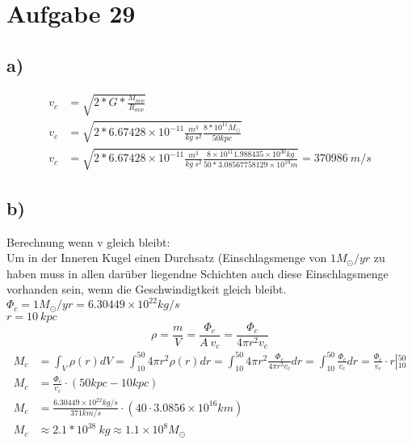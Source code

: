 \section{Aufgabe 29}
\subsection{a)}

\begin{align}
v_{c} &= \sqrt{2*G*\frac{M_{mw}}{R_{mw}}}\nonumber\\
v_{c} &= \sqrt{2*6.67428 \times 10^{-11} \frac{m^3}{kg ~ s^2}  \frac{8*10^{11} M_{\odot}}{50 kpc}}\nonumber\\
v_{c} &= \sqrt{2*6.67428 \times 10^{-11} \frac{m^3}{kg ~ s^2}  \frac{8 \times 10^{11} 1.988435 \times 10^{30} kg}{50*3.08567758129 \times 10^{19} m}} = 370986~m/s
\end{align}

\subsection{b)}
Berechnung wenn v gleich bleibt:\\
Um in der Inneren Kugel einen Durchsatz (Einschlagsmenge von $1 M_\odot/yr$ zu haben muss in allen darüber liegendne Schichten auch diese Einschlagsmenge vorhanden sein, wenn die Geschwindigtkeit gleich bleibt.\\
\(\Phi_{c} = 1M_\odot/yr = 6.30449\times 10^{22} kg/s\)\\
\(r=10~kpc\)
\begin{equation}
\rho = \frac{m}{V} = \frac{\Phi_{c}}{A~v_{c}} = \frac{\Phi_{c}}{4\pi r^2 v_{c}}
\end{equation}
\begin{align}
M_{c} &= \int_{V} \rho(r)dV = \int_{10}^{50} 4 \pi r^2 \rho(r) dr = \int_{10}^{50} 4 \pi r^2 \frac{\Phi_{c}}{4\pi r^2 v_{c}} dr = \int_{10}^{50} \frac{\Phi_{c}}{v_{c}} dr = \frac{\Phi_{c}}{v_{c}}\cdot r \left |_{10}^{50}\right.\nonumber\\
M_{c}&=\frac{ \Phi_{c}}{v_c}\cdot(50kpc-10kpc)\nonumber\\
M_{c}&=\frac{  6.30449\times 10^{22} kg/s}{371 km/s}\cdot(40 \cdot 3.0856 \times 10^{16} km)\nonumber\\
M_{c}&\approx 2.1 * 10^{38}~kg\approx 1.1 \times 10^8 M_\odot
\end{align}


